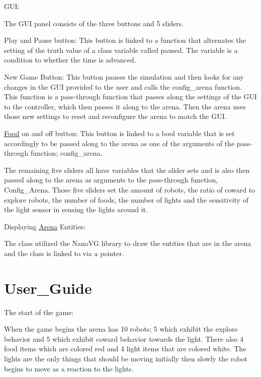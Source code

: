\begin{DoxyItemize}
\item G\+UI\+:
\begin{DoxyItemize}
\item The G\+UI panel consists of the three buttons and 5 sliders.
\item Play and Pause button\+: This button is linked to a function that alternates the setting of the truth value of a class variable called paused. The variable is a condition to whether the time is advanced.
\item New Game Button\+: This button pauses the simulation and then looks for any changes in the G\+UI provided to the user and calls the config\+\_\+arena function. This function is a pass-\/through function that passes along the settings of the G\+UI to the controller, which then passes it along to the arena. Then the arena uses those new settings to reset and reconfigure the arena to match the G\+UI.
\item \hyperlink{class_food}{Food} on and off button\+: This button is linked to a bool variable that is set accordingly to be passed along to the arena as one of the arguments of the pass-\/through function; config\+\_\+arena.
\item The remaining five sliders all have variables that the slider sets and is also then passed along to the arena as arguments to the pass-\/through function, Config\+\_\+\+Arena. Those five sliders set the amount of robots, the ratio of coward to explore robots, the number of foods, the number of lights and the sensitivity of the light sensor in sensing the lights around it.
\end{DoxyItemize}
\item Displaying \hyperlink{class_arena}{Arena} Entities\+:
\begin{DoxyItemize}
\item The class utilized the Nano\+VG library to draw the entities that are in the arena and the class is linked to via a pointer.
\end{DoxyItemize}
\end{DoxyItemize}\hypertarget{index_User_Guide}{}\section{User\+\_\+\+Guide}\label{index_User_Guide}
The start of the game\+:

When the game begins the arena has 10 robots; 5 which exhibit the explore behavior and 5 which exhibit coward behavior towards the light. There also 4 food items which are colored red and 4 light items that are colored white. The lights are the only things that should be moving initially then slowly the robot begins to move as a reaction to the lights.

